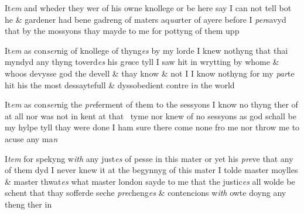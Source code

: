 \documentclass[12pt, a4paper]{book}
\begin{document}
            			
		\ifthenelse{\isodd{\thepage}}
		{\reversemarginpar}
		{\normalmarginpar}
		 It\textit{em} and wheder they wer of his owne knollege or be here
 say I can not tell bot he \& gardener had bene gadreng
 of maters aq\textit{ua}rter of ayere before I \textit{per}savyd that by
 the mossyons thay mayde to me for pottyng of them
 upp
            		
            		
            			
				\marginpar[\vspace{0.5cm}{\textcolor{Gray}{6.}}]{}
			
            			
		\ifthenelse{\isodd{\thepage}}
		{\reversemarginpar}
		{\normalmarginpar}
		 It\textit{em} as con\textit{ser}nig of knollege of thyng\textit{es} by my lorde I knew
            				nothyng that thai myndyd any thyng toverd\textit{es} his g\textit{ra}ce
 tyll I saw hit in wrytting by whome \& whoos devysse god
 the devell \& thay know \& not I I know nothyng for my \textit{par}te
 hit his the most dessaytefull \& dyssobedient contre i\textit{n} the world
            		
            		
            			
				\marginpar[\vspace{0.5cm}{\textcolor{Gray}{7.}}]{}
			
            			
		\ifthenelse{\isodd{\thepage}}
		{\reversemarginpar}
		{\normalmarginpar}
		 It\textit{em} as con\textit{ser}nig the \textit{pre}ferment of them to the sessyons I know
 no thyng ther of at all nor was not in kent at that 
 tyme nor knew of no sessyons as god schall be my
 hylpe tyll thay were done I ham sure there come
 none fro me nor throw me to acuse any ma\textit{n}
            		
            		
            			
				\marginpar[\vspace{0.5cm}{\textcolor{Gray}{8.}}]{}
			
            			
		\ifthenelse{\isodd{\thepage}}
		{\reversemarginpar}
		{\normalmarginpar}
		 I\textit{tem} for spekyng w\textit{ith} any just\textit{es} of pesse in this mater or
 yet his \textit{pre}ve that any of them dyd I never knew it
            				at the begynnyg of this mater I tolde master moylles
 \& master thwat\textit{es} what master london sayde to me that
 the justic\textit{es} all wolde be schent that thay sofferde seche
 \textit{pre}cheng\textit{es }\& contencions w\textit{ith} owte doyng any theng ther
 in
            		

\dotfill
					
\end{document}
